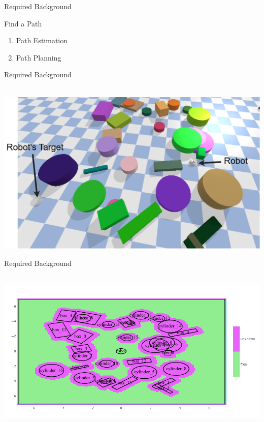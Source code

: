 \begin{frame}[fragile]{Required Background} 
\begin{block}{Find a Path}
\begin{enumerate}
  \item Path Estimation\\
  \item Path Planning\\
\end{enumerate}
\end{block}
\end{frame}

\begin{frame}[fragile]{Required Background} 
  \begin{center}
  \hbox{\hspace{-0.5em} \includegraphics[width=1.0\textwidth]{figures/required_background/is_there_a_path}}
  \end{center}
\end{frame}

\begin{frame}[fragile]{Required Background} 
  \begin{center}
  \hbox{\hspace{-0.05\textwidth} \includegraphics[width=1.1\textwidth]{figures/required_background/occupancy_grid} }
  \end{center}
\end{frame}

